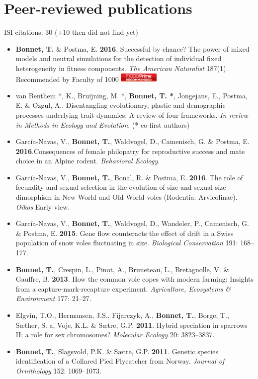 \documentclass[a4paper,10pt]{article} %
\begin{document}
\section*{Peer-reviewed publications}
ISI citations: 30 (+10 then did not find yet)
\vspace{10pt}
\begin{itemize}
\item \textbf{Bonnet, T.} \& Postma, E. \textbf{2016}. Successful by chance? The power of mixed models and neutral simulations for the detection of individual fixed heterogeneity in fitness components. \textit{The American Naturalist} 187(1). {\footnotesize Recommended by Faculty of 1000}
\includegraphics[width=0.15\textwidth]{F1000badge}
\item van Benthem *, K., Bruijning, M. *, \textbf{Bonnet, T. *}, Jongejans, E., Postma, E. \& Ozgul, A.. Disentangling evolutionary, plastic and demographic processes underlying trait dynamics: A review of four frameworks. \textit{In review in Methods in Ecology and Evolution}. (* co-first authors)
\item Garc\'{i}a-Navas, V., \textbf{Bonnet, T.}, Waldvogel, D., Camenisch, G. \& Postma, E. \textbf{2016}.Consequences of female philopatry for reproductive success and mate choice in an Alpine rodent. \textit{Behavioral Ecology}.
\item Garc\'{i}a-Navas, V., \textbf{Bonnet, T.}, Bonal, R. \& Postma, E. \textbf{2016}. The role of fecundity and sexual selection in the evolution of size and sexual size dimorphism in New World and Old World voles (Rodentia: Arvicolinae). \textit{Oikos} Early view.
\item Garc\'{i}a-Navas, V., \textbf{Bonnet, T.}, Waldvogel, D., Wandeler, P., Camenisch, G. \& Postma, E. \textbf{2015}. Gene flow counteracts the effect of drift in a Swiss population of snow voles fluctuating in size. \textit{Biological Conservation} 191: 168--177.
\item \textbf{Bonnet, T.}, Crespin, L., Pinot, A., Bruneteau, L., Bretagnolle, V. \& Gauffre, B. \textbf{2013}. How the common vole copes with modern farming: Insights from a capture-mark-recapture experiment. \textit{Agriculture, Ecosystems \& Environment} 177: 21--27.
\item Elgvin, T.O., Hermansen, J.S., Fijarczyk, A., \textbf{Bonnet, T.}, Borge, T., S{\ae}ther, S. a, Voje, K.L. \& S{\ae}tre, G.P. \textbf{2011}. Hybrid speciation in sparrows II: a role for sex chromosomes? \textit{Molecular Ecology} 20: 3823--3837.
\item \textbf{Bonnet, T.}, Slagsvold, P.K. \& S{\ae}tre, G.P. \textbf{2011}. Genetic species identification of a Collared Pied Flycatcher from Norway. \textit{Journal of Ornithology} 152: 1069--1073.
\end{itemize}
\end{document}
